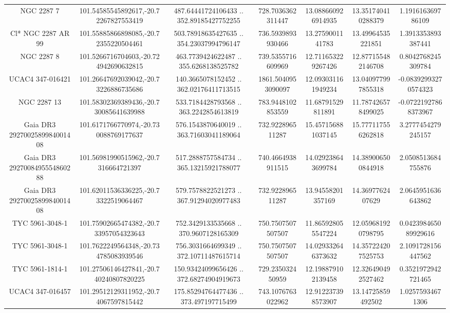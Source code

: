 \begin{table}
\begin{tabular}{ccccccc}
NGC  2287     7 & 101.54585545892617,-20.72267827553419 & 487.64441724106433 .. 352.89185427752255 & 728.7036362311447 & 13.088660926914935 & 13.351740410288379 & 1.191616369786109 \\
Cl* NGC 2287     AR      99 & 101.55885866898085,-20.72355220504461 & 503.78918635427635 .. 354.23037994796147 & 736.5939893930466 & 13.2759001141783 & 13.49964535221851 & 1.3913353893387441 \\
NGC  2287     8 & 101.5266716704603,-20.724942690632815 & 463.7739424622487 .. 355.6268138525782 & 739.5355716609969 & 12.711653229267426 & 12.877155482146708 & 0.8042768245309784 \\
UCAC4 347-016421 & 101.26647692039042,-20.73226886735686 & 140.3665078152452 .. 362.02176411713515 & 1861.5040953090097 & 12.093031161949234 & 13.040977997855318 & -0.08392993270574323 \\
NGC  2287    13 & 101.58302369389436,-20.730085641639988 & 533.7184428793568 .. 363.2242854613819 & 783.9448102853559 & 11.68791529811891 & 11.787426578499025 & -0.07221927868373967 \\
Gaia DR3 2927002589984001408 & 101.6171766770974,-20.730088769177637 & 576.1543870640019 .. 363.71603041189064 & 732.922896511287 & 15.457156881037145 & 15.777117556262818 & 3.2777454279245157 \\
Gaia DR3 2927008495554860288 & 101.56981990515962,-20.7316664721397 & 517.2888757584734 .. 365.13215921788077 & 740.4664938911515 & 14.029238643699784 & 14.389006500844918 & 2.0508513684755876 \\
Gaia DR3 2927002589984001408 & 101.62011536336225,-20.73322519064467 & 579.7578822521273 .. 367.91294020977483 & 732.922896511287 & 13.94558201357169 & 14.3697762407629 & 2.0645951636643862 \\
TYC 5961-3048-1 & 101.75902665474382,-20.733957054323643 & 752.3429133535668 .. 370.9607128165309 & 750.7507507507507 & 11.865928055547224 & 12.059681920798795 & 0.042398465089929616 \\
TYC 5961-3048-1 & 101.7622249564348,-20.734785083939546 & 756.3031664699349 .. 372.10711487615714 & 750.7507507507507 & 14.029332646373632 & 14.357224207525753 & 2.1091728156447562 \\
TYC 5961-1814-1 & 101.27506146427841,-20.740240807820225 & 150.93424099656426 .. 372.68274904919673 & 729.235032450959 & 12.198879102139458 & 12.326490492527462 & 0.3521972942721465 \\
UCAC4 347-016457 & 101.29512129311952,-20.74067597815442 & 175.85294764477436 .. 373.497197715499 & 743.1076763022962 & 12.912237398573907 & 13.14725859492502 & 1.02575934671306 \\

\end{tabular}
\end{table}
